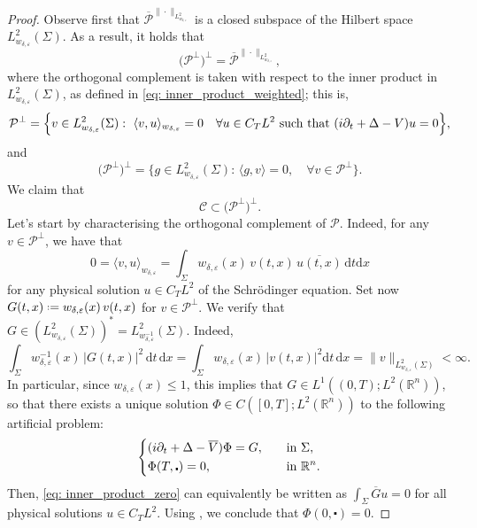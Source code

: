 \documentclass[10pt,a4paper]{amsart}
\theoremstyle{remark}
\theoremstyle{definition}
\newcommand{\R}{\mathbb{R}}
\newcommand{\dd}{\mathrm{d}}
\newcommand*{\defeq}{\mathrel{\vcenter{\baselineskip0.5ex \lineskiplimit0pt
			\hbox{\scriptsize.}\hbox{\scriptsize.}}}%
	=}
\def\ve{\varepsilon}
\def\cal{\mathcal}
\def\ovl{\overline}
\def\cd{\centerdot}
\def\d{\partial}
\begin{document}
\begin{proof}%
%
Observe first that $\ovl{\cal{P}}^{\|\cdot\|_{L_{w_{\delta, \ve}}^2}} $ is a closed subspace of the Hilbert space $L_{w_{\delta, \ve}}^2(\Sigma)$. 
As a result, it holds that 
%
\[
\big({\cal{P}^\perp}\big)^{\perp} = \ovl{\cal{P}}^{\|\cdot\|_{L_{w_{\delta, \ve}}^2}},
\]
%
where the orthogonal complement is taken with respect to the inner product in $L_{w_{\delta, \ve}}^2(\Sigma)$, as defined in \eqref{eq: inner_product_weighted}; this is,
%
\[
\cal{P}^{\perp} = 
\Big\{ v\in L_{w_{\delta, \ve}}^2(\Sigma): \,\, \langle v, u \rangle_{w_{\delta, \ve}}=0 \quad \forall u\in C_T L^2 \,\, \textup{such that} \,\, (i\d_t +\Delta - V)u=0 \Big\}, 
\]
%
and
%
\[
\big({\cal{P}}^{\perp}\big)^{\perp} = 
\Big\{ g\in L_{w_{\delta, \ve}}^2(\Sigma) : \, \langle g, v\rangle = 0 , \quad \forall v\in \mathcal P ^\perp \Big\}.
\]
%
We claim that 
%
\[
\cal{C} \subset \big({\cal{P}}^{\perp}\big)^{\perp}.
\]
%
Let's start by characterising the orthogonal complement of $\mathcal P$. Indeed, for any $v\in \cal{P}^{\perp}$, we have that 
%
\begin{equation}\label{eq: inner_product_zero}
0=\langle v, u\rangle_{w_{\delta, \ve}}=\int_\Sigma w_{\delta,\ve}(x)\,v(t,x)\,\overline{u(t,x)}\, \dd t \dd x
\end{equation}
%
for any physical solution $u\in C_TL^2$ of the Schr\"odinger equation. Set now $G(t, x)\defeq w_{\delta,\ve}(x)\,v(t, x)$ for $v\in \cal{P}^{\perp}$. 
We verify that $G\in (L^2_{w_{\delta, \ve}} (\Sigma))^* =L^2_{w_{\delta, \ve}^{-1}}(\Sigma)$. Indeed,
%
\[
\int_{\Sigma}  w_{\delta,\ve}^{-1}(x)\,|G(t, x)|^2 \, \dd t \, \dd x
= \int_{\Sigma}w_{\delta,\ve}(x)\, |v(t, x)|^2 \dd t \, \dd x = \|v\|_{L^2_{w_{\delta, \ve}}(\Sigma)}< \infty. 
\]
%
In particular, since $w_{\delta,\ve}(x)\leq 1$, this implies that $G\in L^1((0, T); L^2(\R^n))$, so that there exists a unique solution $\Phi\in C([0, T]; L^2(\R^n))$ to the following artificial problem: 
%
\begin{equation}\label{eq: art_prob}
\begin{dcases}
(i\d_t+\Delta - \ovl{V})\Phi = G, \quad &\textup{in}\,\, \Sigma, \\
\Phi(T, \cd) = 0, &\textup{in}\,\, \R^n.
\end{dcases} 
\end{equation}
%
Then, \eqref{eq: inner_product_zero} can equivalently be written as $\displaystyle \int_\Sigma \ovl{G} u = 0$ for all physical solutions $u\in C_TL^2$. Using \cite[Lemma 4.5]{zbMATH07801151}, we conclude that $\Phi(0, \cd)=0$. 

\end{proof}
\end{document}
